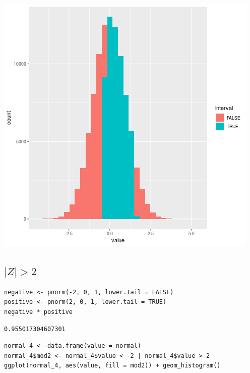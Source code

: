 \documentclass[11pt]{article}
\begin{document}
\begin{center}
\includegraphics[width=.9\linewidth]{1-3.png}
\end{center}

\subsection{\(|Z| > 2\)}
\label{sec:org964c678}

\begin{verbatim}
negative <- pnorm(-2, 0, 1, lower.tail = FALSE)
positive <- pnorm(2, 0, 1, lower.tail = TRUE)
negative * positive
\end{verbatim}

\begin{verbatim}
0.955017304607301
\end{verbatim}


\begin{verbatim}
normal_4 <- data.frame(value = normal)
normal_4$mod2 <- normal_4$value < -2 | normal_4$value > 2
ggplot(normal_4, aes(value, fill = mod2)) + geom_histogram()
\end{verbatim}
\end{document}
